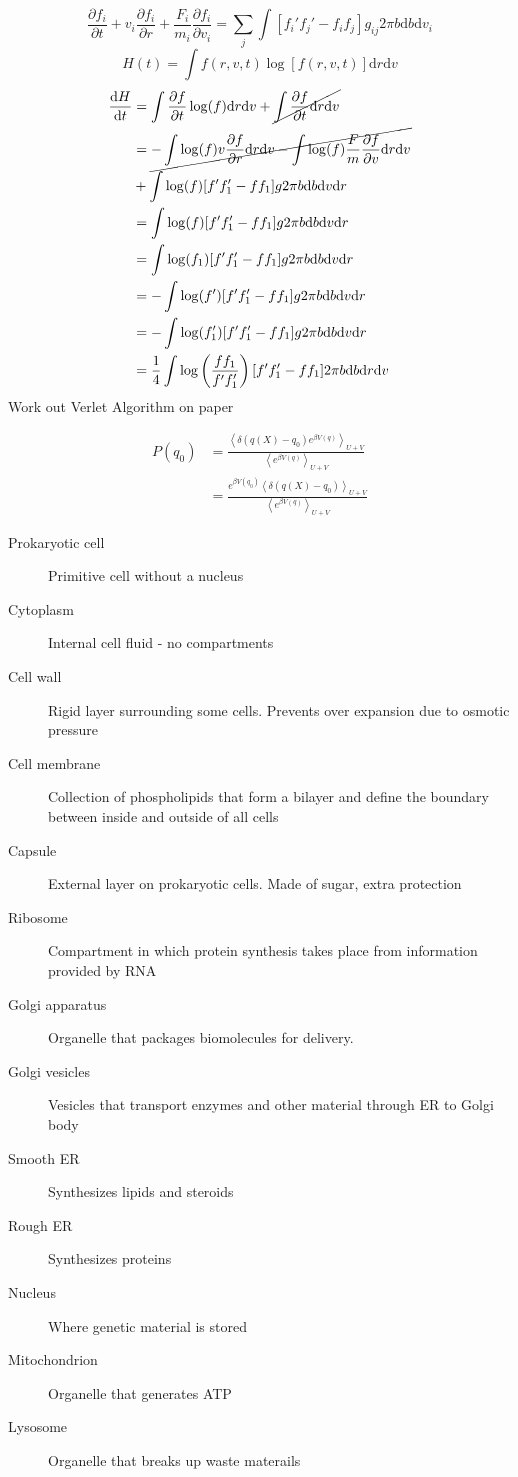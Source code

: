 \documentclass[letterpaper]{article}
\providecommand{\ainner}[1]{\left\langle#1\right\rangle}
\def\d{\mathrm{d}}
\begin{document}
\begin{multicols}{2}
\[
\frac{\partial f_i}{\partial t}+v_i\frac{\partial f_i}{\partial
r}+\frac{F_i}{m_i}\frac{\partial f_i}{\partial v_i}
=\sum_j\int[f_i'f_j'-f_if_j]g_{ij}2\pi b\d b\d v_i
\]
\[
H(t)=\int f(r,v,t)\log[f(r,v,t)]\d r\d v
\]
\begin{align*}
\frac{\d H}{\d t}&=\int\frac{\partial f}{\partial t}\log(f)\d r\d v
+\cancel{\int\frac{\partial f}{\partial t}\d r\d v}\\
&=\cancel{-\int\log(f)v\frac{\partial f}{\partial r}\d r\d v
-\int\log(f)\frac{F}{m}\frac{\partial f}{\partial v}\d r\d v}\\
&+\int\log(f)[f'f_1'-ff_1]g2\pi b\d b\d v\d r\\
&=\int\log(f)[f'f_1'-ff_1]g2\pi b\d b\d v\d r\\
&=\int\log(f_1)[f'f_1'-ff_1]g2\pi b\d b\d v\d r\\
&=-\int\log(f')[f'f_1'-ff_1]g2\pi b\d b\d v\d r\\
&=-\int\log(f_1')[f'f_1'-ff_1]g2\pi b\d b\d v\d r\\
&=\frac{1}{4}\int\log\left(\frac{ff_1}{f'f_1'}\right)[f'f_1'-ff_1]2\pi b\d b\d
r\d v
\end{align*}
Work out Verlet Algorithm on paper

\begin{align*}
P(q_0)&=\frac{\ainner{\delta(q(X)-q_0)e^{\beta
V(q)}}_{U+V}}{\ainner{e^{\beta V(q)}}_{U+V}}\\
&=\frac{e^{\beta V(q_0)}\ainner{\delta(q(X)-q_0)}_{U+V}}{\ainner{e^{\beta
V(q)}}_{U+V}}
\end{align*}

\begin{description}
\item[Prokaryotic cell] Primitive cell without a nucleus
\item[Cytoplasm] Internal cell fluid - no compartments
\item[Cell wall] Rigid layer surrounding some cells. Prevents over expansion due
to osmotic pressure
\item[Cell membrane] Collection of phospholipids that form a bilayer and define
the boundary between inside and outside of all cells
\item[Capsule] External layer on prokaryotic cells. Made of sugar, extra
protection
\item[Ribosome] Compartment in which protein synthesis takes place from
information provided by RNA
\item[Golgi apparatus] Organelle that packages biomolecules for delivery.
\item[Golgi vesicles] Vesicles that transport enzymes and other material through
ER to Golgi body
\item[Smooth ER] Synthesizes lipids and steroids
\item[Rough ER] Synthesizes proteins
\item[Nucleus] Where genetic material is stored
\item[Mitochondrion] Organelle that generates ATP
\item[Lysosome] Organelle that breaks up waste materails
\end{description}
\end{multicols}
\end{document}
